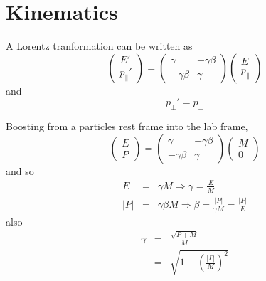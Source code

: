 \chapter{Kinematics}
A Lorentz tranformation can be written as
\begin{equation}
\left(\begin{array}{c} E' \\ p_{\parallel}' \end{array} \right)
=
\left(
\begin{array}{cc}
\gamma & -\gamma\beta \\
-\gamma\beta & \gamma
\end{array}
\right)
\left (\begin{array}{c} E \\ p_{\parallel} \end{array}\right)
\end{equation}
and
\begin{equation}
p_{\perp}' = p_{\perp}
\end{equation}

Boosting from a particles rest frame into the lab frame,
\begin{equation}
\left(\begin{array}{c} E \\ P \end{array} \right)
=
\left(
\begin{array}{cc}
\gamma & -\gamma\beta \\
-\gamma\beta & \gamma
\end{array}
\right)
\left (\begin{array}{c} M \\ 0 \end{array}\right)
\end{equation}
and so
\begin{eqnarray*}
E &=& \gamma M  \Longrightarrow \gamma = \frac{E}{M} \\
|P| &=& \gamma\beta M \Longrightarrow \beta = \frac{|P|}{\gamma M} = \frac{|P|}{E}
\end{eqnarray*}
also
\begin{eqnarray*}
\gamma &=& \frac{\sqrt{P + M}}{M} \\
&=& \sqrt{1 +\left(\frac{|P|}{M}\right)^2}
\end{eqnarray*}

